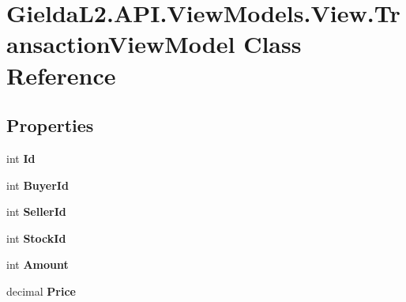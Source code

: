 \hypertarget{class_gielda_l2_1_1_a_p_i_1_1_view_models_1_1_view_1_1_transaction_view_model}{}\section{Gielda\+L2.\+A\+P\+I.\+View\+Models.\+View.\+Transaction\+View\+Model Class Reference}
\label{class_gielda_l2_1_1_a_p_i_1_1_view_models_1_1_view_1_1_transaction_view_model}
\subsection*{Properties}
\begin{DoxyCompactItemize}
\item 
\mbox{\label{class_gielda_l2_1_1_a_p_i_1_1_view_models_1_1_view_1_1_transaction_view_model_aeefd21de823604c5b9a85b5d39bc4618}} 
int {\bfseries Id}
\item 
\mbox{\label{class_gielda_l2_1_1_a_p_i_1_1_view_models_1_1_view_1_1_transaction_view_model_ab434026be4a19ad151ff93f703bd3467}} 
int {\bfseries Buyer\+Id}
\item 
\mbox{\label{class_gielda_l2_1_1_a_p_i_1_1_view_models_1_1_view_1_1_transaction_view_model_a2b6a5f94ecbae8dc1c76e16c1146d4cb}} 
int {\bfseries Seller\+Id}
\item 
\mbox{\label{class_gielda_l2_1_1_a_p_i_1_1_view_models_1_1_view_1_1_transaction_view_model_a12c3dcd703b5de17cb66a42b79c3c628}} 
int {\bfseries Stock\+Id}
\item 
\mbox{\label{class_gielda_l2_1_1_a_p_i_1_1_view_models_1_1_view_1_1_transaction_view_model_a6340a2786ae2dacd281cae497e58f2fb}} 
int {\bfseries Amount}
\item 
\mbox{\label{class_gielda_l2_1_1_a_p_i_1_1_view_models_1_1_view_1_1_transaction_view_model_af2c0fc3ef6b9078959e1e13e05272f5b}} 
decimal {\bfseries Price}
\end{DoxyCompactItemize}


